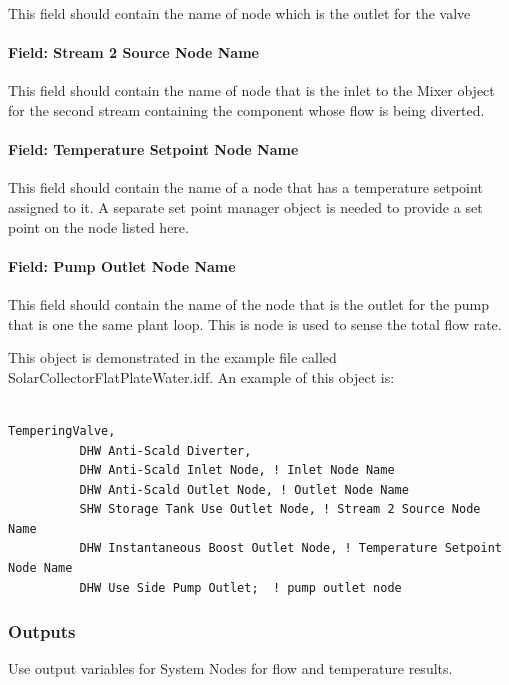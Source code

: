 This field should contain the name of node which is the outlet for the valve

\paragraph{Field: Stream 2 Source Node Name}\label{field-stream-2-source-node-name}

This field should contain the name of node that is the inlet to the Mixer object for the second stream containing the component whose flow is being diverted.

\paragraph{Field: Temperature Setpoint Node Name}\label{field-temperature-setpoint-node-name-000}

This field should contain the name of a node that has a temperature setpoint assigned to it. A separate set point manager object is needed to provide a set point on the node listed here.

\paragraph{Field: Pump Outlet Node Name}\label{field-pump-outlet-node-name}

This field should contain the name of the node that is the outlet for the pump that is one the same plant loop. This is node is used to sense the total flow rate.

This object is demonstrated in the example file called SolarCollectorFlatPlateWater.idf. An example of this object is:

\begin{lstlisting}

TemperingValve,
          DHW Anti-Scald Diverter,
          DHW Anti-Scald Inlet Node, ! Inlet Node Name
          DHW Anti-Scald Outlet Node, ! Outlet Node Name
          SHW Storage Tank Use Outlet Node, ! Stream 2 Source Node Name
          DHW Instantaneous Boost Outlet Node, ! Temperature Setpoint Node Name
          DHW Use Side Pump Outlet;  ! pump outlet node
\end{lstlisting}

\subsubsection{Outputs}\label{outputs-023}

Use output variables for System Nodes for flow and temperature results.
